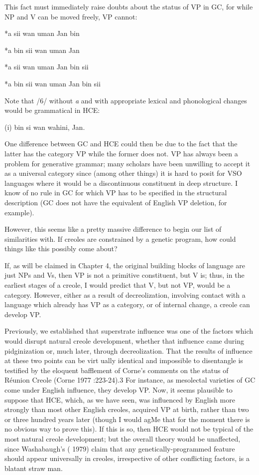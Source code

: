 This fact must immediately raise doubts about the status of
VP in GC, for while NP and V can be moved freely, VP cannot:

\ea\label{ex:5}
 *a sii wan uman Jan bin
\z

\ea\label{ex:6}
 *a bin sii wan uman Jan
\z

\ea\label{ex:7}
*a sii wan uman Jan bin sii
\z

\ea\label{ex:8}
 *a bin sii wan uman Jan bin sii
\z

Note that /6/ without \textit{a} and with appropriate lexical and phonological changes would be grammatical in HCE:

\ea\label{ex:9}
(i) bin si wan wahini, Jan.
\z

One difference between GC and HCE could then be due to the fact that the latter has the category VP while the former does not. VP has always been a problem for generative grammar; many scholars
have been unwilling to accept it as a universal category since (among
other things) it is hard to posit for VSO languages where it would be a discontinuous constituent in deep structure. I know of no rule in GC for which VP has to be specified in the structural description (GC does not have the equivalent of English VP deletion, for example).

However, this seems like a pretty massive difference to begin our list of similarities with. If creoles are constrained by a genetic program, how could things like this possibly come about?

If, as will be claimed in Chapter 4, the original building blocks of language are just NPs and Vs, then VP is not a primitive constituent, but V is; thus, in the earliest stages of a creole, I would predict that V, but not VP, would be a category. However, either as a result of decreolization, involving contact with a language which already has VP as a category, or of internal change, a creole can develop VP.

Previously, we established that superstrate influence was one of the factors which would disrupt natural creole development, whether that influence came during pidginization or, much later, through
decreolization. That the results of influence at these two points can be virt ually identical and impossible to disentangle is testified by the eloquent bafflement of Corne's comments on the status of Réunion Creole (Corne 1977 :223{}-24).3 For instance, as mesolectal varieties of GC come under English influence, they develop VP. Now, it seems plausible to suppose that HCE, which, as we have seen, was influenced by English more strongly than most other English creoles, acquired VP at birth, rather than two or three hundred years later (though I would agMe that for the moment there is no obvious way to prove this). If this is so, then HCE would not be typical of the most natural creole development; but the overall theory would be unaffected, since Washabaugh's ( 1979) claim that any genetically-programmed feature should appear universally in creoles, irrespective of other conflicting factors, is a blatant straw man.

